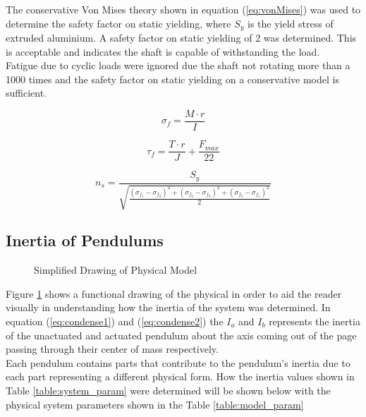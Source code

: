 The conservative Von Mises theory shown in equation (\ref{eq:vonMises}) was used to determine the safety factor on static yielding, where $S_{y}$ is the yield stress of extruded aluminium. A safety factor on static yielding of 2 was determined. This is acceptable and indicates the shaft is capable of withstanding the load.\\

Fatigue due to cyclic loads were ignored due the shaft not rotating more than a 1000 times and the safety factor on static yielding  on a conservative model is sufficient.

\begin{equation} \label{eq:axialForce}
\sigma_{f} = \frac{M\cdot r}{I}
\end{equation}

\begin{equation} \label{eq:torsionForce}
\tau_{f} = \frac{T\cdot r}{J} + \frac{F_{max}}{22}
\end{equation}


\begin{equation} \label{eq:vonMises}
n_{s} = \frac{S_{y}}{\sqrt{\frac{(\sigma_{f_{1}}-\sigma_{f_{2}})^2+(\sigma_{f_{2}}-\sigma_{f_{3}})^2+(\sigma_{f_{3}}-\sigma_{f_{1}})^2}{2}}}
\end{equation}

\subsection{Inertia of Pendulums}
\begin{figure}[h]
	\centering
	
	\caption{Simplified Drawing of Physical Model}
	\label{fig:model_drawing}
\end{figure}

Figure \ref{fig:model_drawing} shows a functional drawing of the physical in order to aid the reader visually in understanding how the inertia of the system was determined. In equation (\ref{eq:condense1}) and (\ref{eq:condense2}) the $I_{a}$ and $I_{b}$ represents the inertia of the unactuated and actuated pendulum about the axis coming out of the page passing through their center of mass respectively.\\

Each pendulum contains parts that contribute to the pendulum's inertia due to each part representing a different physical form. How the inertia values shown in Table \ref{table:system_param} were determined will be shown below with the physical system parameters shown in the Table \ref{table:model_param}\\

